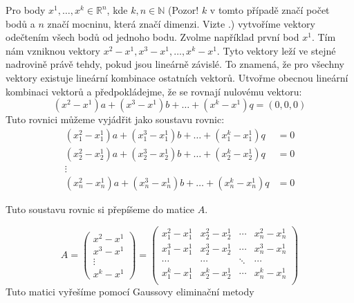 Pro body $x^1, \ldots, x^k \in \mathbb{R}^n$, kde  $k, n \in \mathbb{N}$ (Pozor! $k$ v tomto případě značí počet bodů a $n$ značí mocninu, která značí dimenzi. Vizte .) vytvoříme vektory odečtením všech bodů od jednoho bodu. Zvolme například první bod $x^1$. Tím nám vzniknou vektory $x^2-x^1, x^3-x^1, \dots, x^k-x^1$. Tyto vektory leží ve stejné nadrovině právě tehdy, pokud jsou lineárně závislé. To znamená, že pro všechny vektory existuje lineární kombinace ostatních vektorů. %
Utvořme obecnou lineární kombinaci vektorů a předpokládejme, že se rovnají nulovému vektoru:
\begin{equation*}
  (x^2-x^1)a + (x^3-x^1)b + \dots + (x^k-x^1)q = (0, 0, 0)
\end{equation*}
Tuto rovnici můžeme vyjádřit jako soustavu rovnic:
\begin{align*}
  (x^2_1 - x^1_1)a + (x^3_1 - x^1_1)b + \dots + (x^k_1 - x^1_1)q &= 0 \\
  (x^2_2 - x^1_2)a + (x^3_2 - x^1_2)b + \dots + (x^k_2 - x^1_2)q &= 0 \\
  \vdots \\
  (x^2_n - x^1_n)a + (x^3_n - x^1_n)b + \dots + (x^k_n - x^1_n)q &=0 
\end{align*}

Tuto soustavu rovnic si přepíšeme do matice $A$.

\begingroup
\renewcommand*{\arraystretch}{1.25}
\begin{equation*}
  A =
  \begin{pmatrix}
    x^2-x^1 \\
    x^3-x^1 \\
    \vdots  \\
    x^k-x^1
  \end{pmatrix}
  =
  \begin{pmatrix}
    x^2_1 - x^1_1 & x^2_2 - x^1_2 & \cdots & x^2_n - x^1_n \\
    x^3_1 - x^1_1 & x^3_2 - x^1_2 & \cdots & x^3_n - x^1_n \\
    \cdots        & \cdots        & \ddots & \cdots        \\
    x^k_1 - x^1_1 & x^k_2 - x^1_2 & \cdots & x^k_n - x^1_n \\
  \end{pmatrix}
\end{equation*}
\endgroup
Tuto matici vyřešíme pomocí Gaussovy eliminační metody

